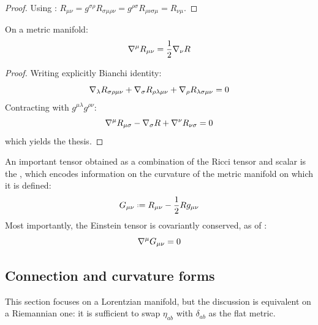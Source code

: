 \begin{proofbox}
  \begin{proof}
    Using : $ R_{\mu \nu} = g^{\sigma \rho} R_{\sigma \mu \rho \nu} = g^{\rho \sigma} R_{\rho \nu \sigma \mu} = R_{\nu \mu} $.
  \end{proof}
\end{proofbox}

\begin{proposition}{}{}
  On a metric manifold:
  \begin{equation}
    \nabla^\mu R_{\mu \nu} = \frac{1}{2} \nabla_\nu R
    \label{eq:ricci}
  \end{equation}
\end{proposition}

\begin{proofbox}
  \begin{proof}
    Writing explicitly Bianchi identity:
    \begin{equation*}
      \nabla_\lambda R_{\sigma \rho \mu \nu} + \nabla_\sigma R_{\rho \lambda \mu \nu} + \nabla_\rho R_{\lambda \sigma \mu \nu} = 0
    \end{equation*}
    Contracting with $ g^{\mu \lambda} g^{\rho \nu} $:
    \begin{equation*}
      \nabla^\mu R_{\mu \sigma} - \nabla_\sigma R + \nabla^\nu R_{\nu \sigma} = 0
    \end{equation*}
    which yields the thesis.
  \end{proof}
\end{proofbox}

An important tensor obtained as a combination of the Ricci tensor and scalar is the , which encodes information on the curvature of the metric manifold on which it is defined:
\begin{equation}
  G_{\mu \nu} \defeq R_{\mu \nu} - \frac{1}{2} R g_{\mu \nu}
  \label{eq:einstein-def}
\end{equation}
Most importantly, the Einstein tensor is covariantly conserved, as of :
\begin{equation}
  \nabla^\mu G_{\mu \nu} = 0
\end{equation}

\subsection{Connection and curvature forms}

This section focuses on a Lorentzian manifold, but the discussion is equivalent on a Riemannian one: it is sufficient to swap $ \eta_{ab} $ with $ \delta_{ab} $ as the flat metric.

